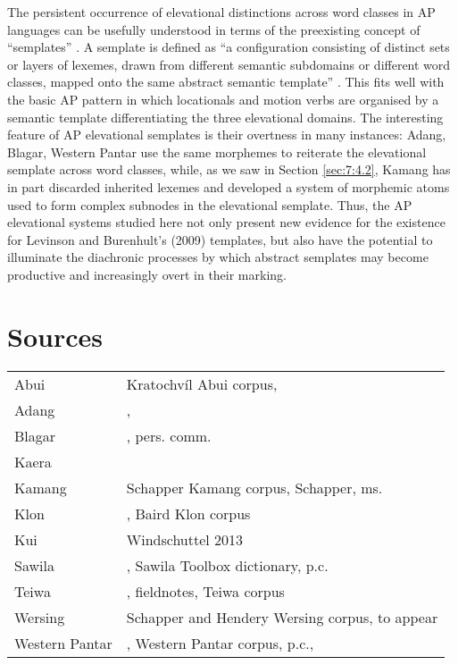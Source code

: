 The persistent occurrence of elevational distinctions across word classes in AP languages can be usefully understood in terms of the preexisting concept of ``semplates'' \citep{LevinsonEtAl2009}. A semplate is defined as ``a configuration consisting of distinct sets or layers of lexemes, drawn from different semantic subdomains or different word classes, mapped onto the same abstract semantic template''  \citep[154]{LevinsonEtAl2009}. This fits well with the basic AP pattern in which locationals and motion verbs are organised by a semantic template differentiating the three elevational domains. The interesting feature of AP elevational semplates is their overtness in many instances: Adang, Blagar, Western Pantar use the same morphemes to reiterate the elevational semplate across word classes, while, as we saw in Section \ref{sec:7:4.2}, Kamang has in part discarded inherited lexemes and developed a system of morphemic atoms used to form complex subnodes in the elevational semplate. Thus, the AP elevational systems studied here not only present new evidence for the existence for Levinson and Burenhult's (2009) templates, but also have the potential to illuminate the diachronic processes by which abstract semplates may become productive and increasingly overt in their marking. \nocite{LevinsonEtAl2009}


\section{Sources}



 
\begin{tabular}{lp{8cm}}
Abui  		&  Kratochv\'il Abui corpus, \citet{Kratochvil2007} \\			
Adang 		&  \citet{Haan2001}, \citet{RobinsonEtAlToAppear} 	\\		
Blagar  		&  \citet{Steinhauer1977,Steinhauer1991,Steinhauer2012}, pers. comm. 	\\
Kaera  		&  \citet{KlamerToAppear} 		\\				
Kamang  		&  Schapper Kamang corpus, Schapper, ms. 	\\				
Klon  		&  \citet{Baird2008}, Baird Klon corpus 	\\				
Kui  		&  Windschuttel 2013\\
Sawila 	 	&  \citet{KratochvilToAppear}, Sawila Toolbox dictionary, p.c.\\
Teiwa  		&  \citet{Klamer2010}, fieldnotes, Teiwa corpus\\
Wersing  	&  Schapper and Hendery Wersing corpus, to appear\\
Western Pantar  	&  \citet{Holton2007,Holton2011,HoltonToAppear}, Western Pantar corpus, p.c., \citet{HoltonEtAl2008}\\ 
\end{tabular}



